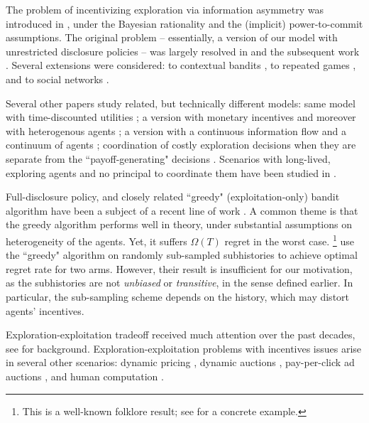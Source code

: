 The problem of incentivizing exploration via information asymmetry was introduced in \cite{Kremer-JPE14}, under the Bayesian rationality and the (implicit) power-to-commit assumptions. The original problem -- essentially, a version of our model with unrestricted disclosure policies -- was largely resolved in \cite{Kremer-JPE14} and the subsequent work \citep{ICexploration-ec15,ICexplorationGames-ec16}. Several extensions were considered: to contextual bandits \citep{ICexploration-ec15}, to repeated games
\citep{ICexplorationGames-ec16}, and to social networks \citep{Bahar-ec16}.

Several other papers study related, but technically different models: same model with time-discounted utilities \citep{Bimpikis-exploration-ms17}; a version with monetary incentives \citep{Frazier-ec14} and moreover with heterogenous agents \citep{Kempe-colt18}; a version with a continuous information flow and a continuum of agents \citep{Che-13}; coordination of costly exploration decisions when they are separate from the ``payoff-generating" decisions \citep{Bobby-Glen-ec16,Annie-ec18-traps,Liang-ec18}. Scenarios with long-lived, exploring agents and no principal to coordinate them have been studied in \citep{Bolton-econometrica99,Keller-econometrica05}.

Full-disclosure policy, and closely related ``greedy" (exploitation-only) bandit algorithm have been a subject of a recent line of work \citep{Sven-aistats18,kannan2018smoothed,bastani2017exploiting,externalities-colt18}.
A common theme is that the greedy algorithm performs well in theory, under  substantial assumptions on heterogeneity of the agents. Yet, it suffers $\Omega(T)$ regret in the worst case.%
\footnote{This is a well-known folklore result; \eg see \citep{CompetingBandits-itcs18} for a concrete example.}
\citet{Baransi-ecml14} use the ``greedy" algorithm on randomly sub-sampled subhistories to achieve optimal regret rate for two arms. However, their result is insufficient for our motivation, as the subhistories are not \emph{unbiased} or \emph{transitive}, in the sense defined earlier. In particular, the sub-sampling scheme depends on the history, which may distort agents' incentives.

Exploration-exploitation tradeoff received much attention over the past decades,
see  \citep{Bubeck-survey12,Gittins-book11} for background.
Exploration-exploitation problems with incentives issues arise in several other scenarios: dynamic pricing
    \citep{KleinbergL03,BZ09,BwK-focs13},
dynamic auctions
    \citep{AtheySegal-econometrica13,DynPivot-econometrica10,Kakade-pivot-or13},
pay-per-click ad auctions
    \citep{MechMAB-ec09,DevanurK09,Transform-ec10-jacm},
and human computation
    \citep{RepeatedPA-ec14,Ghosh-itcs13,Krause-www13}.
